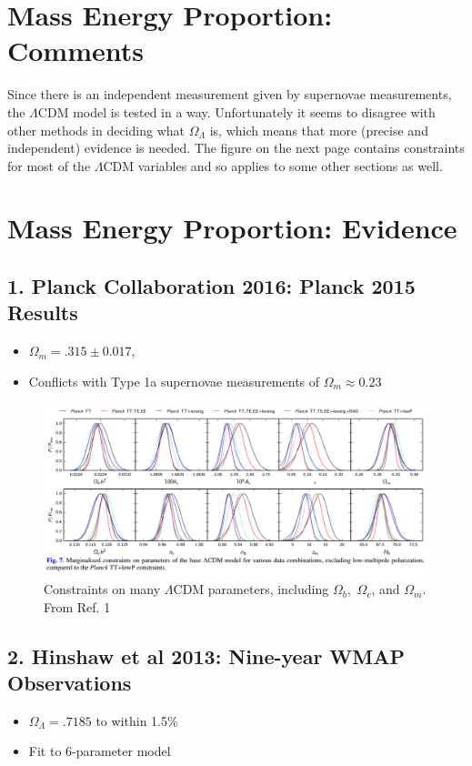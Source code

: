 \documentclass{article}
\begin{document}
\newpage
\section{Mass Energy Proportion: Comments}
Since there is an independent measurement given by supernovae measurements, the $\Lambda$CDM model is tested in a way. Unfortunately it seems to disagree with other methods in deciding what $\Omega_\Lambda$ is, which means that more (precise and independent) evidence is needed. The figure on the next page contains constraints for most of the $\Lambda$CDM variables and so applies to some other sections as well.

\newpage
\section*{Mass Energy Proportion: Evidence}
\subsection*{1. Planck Collaboration 2016: Planck 2015 Results}
\begin{itemize}
\item $\Omega_m=.315\pm0.017$, 
\item Conflicts with Type 1a supernovae measurements of $\Omega_m\approx0.23$
\end{itemize}

\begin{figure}[h]
\begin{center}
\includegraphics[width=\textwidth,angle=0.]{lambdaCDMconstraints.png}
\end{center}
\caption{Constraints on many $\Lambda$CDM parameters, including $\Omega_b$,~$\Omega_c$, and $\Omega_m$. From Ref. 1}
\end{figure}

\subsection*{2. Hinshaw et al 2013: Nine-year WMAP Observations}
\begin{itemize}
\item $\Omega_\Lambda=.7185$ to within 1.5\%
\item Fit to 6-parameter model
\end{itemize}
\end{document}
